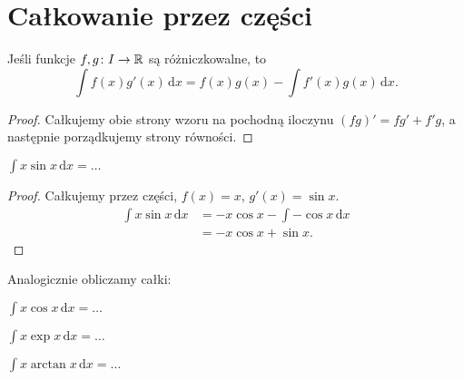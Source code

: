 %

\section{Całkowanie przez części}

\begin{proposition}
\label{prp_int_by_parts}%
    Jeśli funkcje $f, g \colon I \to \mathbb R$ są różniczkowalne, to
    \begin{equation}
        \int f(x) g'(x) \,\mathrm{d}x = f(x) g(x) - \int f'(x) g(x) \,\mathrm{d} x.
    \end{equation}
\end{proposition}

\begin{proof}
    Całkujemy obie strony wzoru na pochodną iloczynu $(fg)' = fg' + f'g$, a następnie porządkujemy strony równości.
\end{proof}

\begin{integral}
    $\int x \sin x \,\mathrm{d} x = \ldots$
\end{integral}

\begin{proof}
    Całkujemy przez części, $f(x) = x$, $g'(x) = \sin x$.
    \begin{align}
        \int x \sin x \,\mathrm{d} x & = -x \cos x - \int - \cos x \, \mathrm{d}x \\
                                     & = -x \cos x + \sin x.
    \end{align}
\end{proof}

Analogicznie obliczamy całki:

\begin{multicols}{2}
\begin{integral}
    $\int x \cos x \,\mathrm{d} x = \ldots$
\end{integral}

\begin{integral}
    $\int x \exp x \,\mathrm{d} x = \ldots$
\end{integral}
\end{multicols}

\begin{integral}
    $\int x \arctan x \,\mathrm{d} x = \ldots$
\end{integral}

